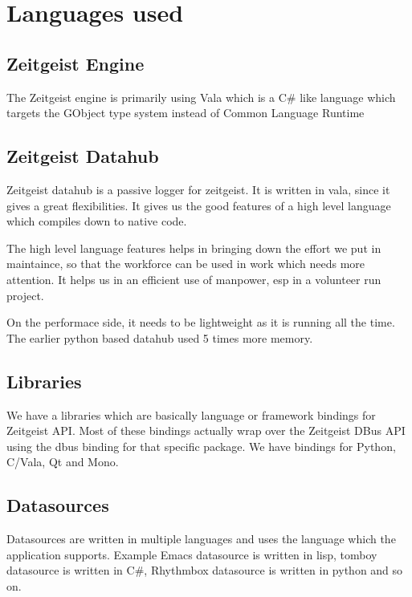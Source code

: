 \section{Languages used}

\subsection{Zeitgeist Engine}
The Zeitgeist engine is primarily using Vala which is a C\# like language 
which targets the GObject type system instead of Common Language Runtime


\subsection{Zeitgeist Datahub}
Zeitgeist datahub is a passive logger for zeitgeist. It is written in 
vala, since it gives a great flexibilities. It gives us the good features 
of a high level language which compiles down to native code. 

The high level language features helps in bringing down the effort we
put in maintaince, so that the workforce can be used in work which needs 
more attention. It helps us in an efficient use of manpower, esp in a 
volunteer run project.

On the performace side, it needs to be lightweight as it is running all 
the time. The earlier python based datahub used 5 times more memory.

\subsection{Libraries}
We have a libraries which are basically language or framework bindings 
for Zeitgeist API. Most of these bindings actually wrap over the 
Zeitgeist DBus API using the dbus binding for that specific package. 
We have bindings for Python, C/Vala, Qt and Mono.
\subsection{Datasources}
Datasources are written in multiple languages and uses the language which 
the application supports. Example Emacs datasource is written in lisp, 
tomboy datasource is written in C\#, Rhythmbox datasource is written in 
python and so on.
